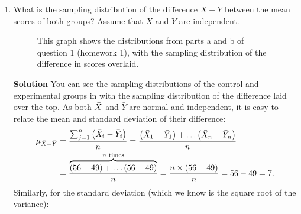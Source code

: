 \begin{enumerate}
\begin{enumerate}
        \item What is the sampling distribution of the difference $\bar{X} - \bar{Y}$ between the mean scores of both groups? Assume that $X$ and $Y$ are independent.
        \FloatBarrier
        \begin{figure}[h]
            \centering
        \caption{This graph shows the distributions from parts a and b of question 1 (homework 1), with the sampling distribution of the difference in scores overlaid. }
        \label{fig:hw1q1c}
        \end{figure}
        \FloatBarrier
        \begin{framed}{\textbf{Solution}}
            You can see the sampling distributions of the control and experimental groups in  with the sampling distribution of the difference laid over the top. As both $\Bar{X}$ and $\bar{Y}$ are normal and independent, it is easy to relate the mean and standard deviation of their difference:
            \begin{align}
                \mu_{\bar{X} - \bar{Y}} &= \frac{\sum_{j=1}^n \left( \bar{X}_i - \bar{Y}_i\right)}{n}  = \frac{\left( \bar{X}_1 - \bar{Y}_1\right) + \dots \left( \bar{X}_n - \bar{Y}_n\right)}{n} \\
                &= \frac{\overbrace{\left( 56 - 49\right) + \dots \left( 56 - 49\right)}^{n \text{ times}}}{n} = \frac{n \times \left( 56-49\right)}{n} = 56-49 = 7.
            \end{align}
            Similarly, for the standard deviation (which we know is the square root of the variance):

\end{framed}
\end{enumerate}
\end{enumerate}

